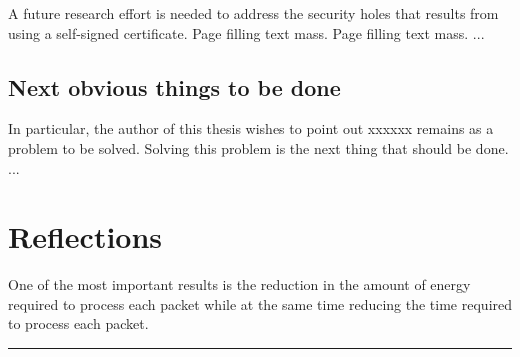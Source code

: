 

A future research effort is needed to address the security holes that results from using a self-signed certificate. Page filling text mass. Page filling text mass. ...


\subsection{Next obvious things to be done}


In particular, the author of this thesis wishes to point out xxxxxx remains as a problem to be solved. Solving this problem is the next thing that should be done. ...


\section{Reflections}
\label{sec:reflections}






One of the most important results is the reduction in the amount of
energy required to process each packet while at the same time reducing the
time required to process each packet.




\noindent\rule{\textwidth}{0.4mm}




\cleardoublepage